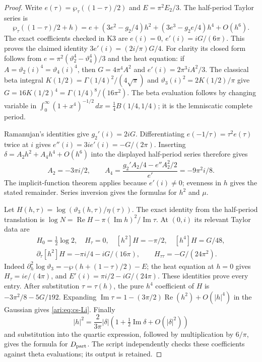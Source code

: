 \begin{proof}
Write $e(\tau)=\wp_\tau((1-\tau)/2)$ and
$E=\pi^2E_2/3$. The half-period Taylor series is
\[
 \wp_\tau((1-\tau)/2+h)
 =e+(3e^2-g_2/4)h^2+(3e^3-g_2e/4)h^4+O(h^6).
\]
The exact coefficients checked in K3 are
$e(i)=0$, $e'(i)=iG/(6\pi)$. This proves the claimed identity
$3e'(i)=(2i/\pi)G/4$. For clarity its closed form follows from
$e=\pi^2(\vartheta_2^4-\vartheta_4^4)/3$ and the heat equation:
if $A=\vartheta_2(i)^4=\vartheta_4(i)^4$, then
$G=4\pi^4A^2$ and $e'(i)=2\pi^3iA^2/3$.
The classical beta integral
$K(1/2)=\Gamma(1/4)^2/(4\sqrt\pi)$ and
$\vartheta_3(i)^2=2K(1/2)/\pi$ give
$G=16K(1/2)^4=\Gamma(1/4)^8/(16\pi^2)$.
The beta evaluation follows by changing variable in
$\int_0^\infty(1+x^4)^{-1/2}\,dx
=\tfrac14 B(1/4,1/4)$; it is the lemniscatic complete period.

Ramanujan's identities give $g_2'(i)=2iG$. Differentiating
$e(-1/\tau)=\tau^2 e(\tau)$ twice at $i$ gives
$e''(i)=3i e'(i)=-G/(2\pi)$. Inserting
$\delta=A_2h^2+A_4h^4+O(h^6)$ into the displayed half-period series
therefore gives
\[
 A_2=-3\pi i/2,\qquad
 A_4=\frac{g_2'A_2/4-e''A_2^2/2}{e'}=-9\pi^2i/8.
\]
The implicit-function theorem applies because $e'(i)\ne0$;
evenness in $h$ gives the stated remainder. Series inversion gives
the formulas for $h^2$ and $\mu$.

Let $H(h,\tau)=\log(\vartheta_3(h,\tau)/\eta(\tau))$. The exact
identity from the half-period translation is
$\log N=\operatorname{Re}H-\pi(\operatorname{Im}h)^2/
\operatorname{Im}\tau$. At $(0,i)$ its relevant Taylor data are
\[
 \begin{gathered}
 H_0=\tfrac12\log2,\quad H_\tau=0,\quad
 [h^2]H=-\pi/2,\quad [h^4]H=G/48,\\
 \partial_\tau[h^2]H=-\pi i/4-iG/(16\pi),\qquad
 H_{\tau\tau}=-G/(24\pi^2).
 \end{gathered}
\]
Indeed $\partial_h^2\log\vartheta_3=-\wp(h+(1-\tau)/2)-E$;
the heat equation at $h=0$ gives $H_\tau=ie/(4\pi)$, and
$E'(i)=\pi i/2-iG/(24\pi)$. These identities prove every entry.
After substitution $\tau=\tau(h)$, the pure $h^4$ coefficient of
$H$ is $-3\pi^2/8-5G/192$. Expanding
$\operatorname{Im}\tau=1-(3\pi/2)\operatorname{Re}(h^2)+O(|h|^4)$
in the Gaussian gives \eqref{ari:eq:cs-Li}. Finally
\[
 |h|^2=\frac{2}{3\pi}|\delta|
          \left(1+\tfrac12\operatorname{Im}\delta+O(|\delta|^2)\right)
\]
and substitution into the quartic expression, followed by
multiplication by $6/\pi$, gives the formula for $D_{\rm part}$.
The script  independently checks
these coefficients against theta evaluations; its output is retained.
\end{proof}

